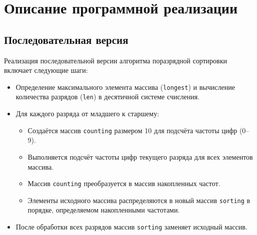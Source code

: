 \documentclass[a4paper,12pt]{article}
\begin{document}
\section{Описание программной реализации}
\subsection{Последовательная версия}
Реализация последовательной версии алгоритма поразрядной сортировки включает следующие шаги:
\begin{itemize}
    \item Определение максимального элемента массива (\texttt{longest}) и вычисление количества разрядов (\texttt{len}) в десятичной системе счисления.
    \item Для каждого разряда от младшего к старшему:
        \begin{itemize}
            \item Создаётся массив \texttt{counting} размером 10 для подсчёта частоты цифр (0–9).
            \item Выполняется подсчёт частоты цифр текущего разряда для всех элементов массива.
            \item Массив \texttt{counting} преобразуется в массив накопленных частот.
            \item Элементы исходного массива распределяются в новый массив \texttt{sorting} в порядке, определяемом накопленными частотами.
        \end{itemize}
    \item После обработки всех разрядов массив \texttt{sorting} заменяет исходный массив.
\end{itemize}
\end{document}
